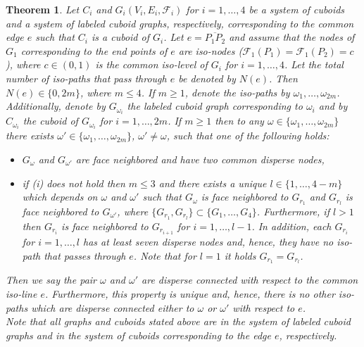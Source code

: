\documentclass[a4paper,11pt]{article}
\newtheorem{theorem}{Theorem}[section]
\begin{document}
\begin{theorem}
Let $C_i$ and $G_i(V_i,E_i,\mathcal{F}_i)$ for $i=1,\ldots,4$ be a system of cuboids and a system of
labeled cuboid graphs, respectively, corresponding to the common edge $e$ such that $C_i$ is a
cuboid of $G_i$. Let $e=\overline{P_1P_2}$ and assume that the nodes of $G_1$ corresponding to
the end points of $e$ are iso-nodes ($\mathcal{F}_1(P_1)=\mathcal{F}_1(P_2)=c$), where $c\in (0,1)$
is the common iso-level of $G_i$ for $i=1,\ldots,4$. Let the total number of iso-paths
that pass through $e$ be denoted by $N(e)$. Then $N(e)\in\{0,2m\}$, where
$m\leq 4$. If $m \geq 1$, denote the iso-paths by $\omega_1,\ldots,\omega_{2m}$. Additionally,
denote by $G_{\omega_i}$ the labeled cuboid graph corresponding to $\omega_i$ and by $C_{\omega_i}$
the cuboid of $G_{\omega_i}$ for $i=1,\ldots,2m$. If $m \geq 1$ then to any $\omega\in\{\omega_1,
\ldots,\omega_{2m}\}$ there exists $\omega'\in\{\omega_1,\ldots,\omega_{2m}\}$,
$\omega'\neq\omega$, such that one of the following holds:
\begin{itemize}
\item[(i)] $G_{\omega}$ and $G_{\omega'}$ are face neighbored and have two common
disperse nodes,
\item[(ii)] if (i) does not hold then $m\leq 3$ and there exists a unique $l\in\{1,\ldots,4-m\}$ which
depends on $\omega$ and $\omega'$ such that $G_{\omega}$ is face neighbored to $G_{r_1}$ and
$G_{r_l}$ is face neighbored to $G_{\omega'}$, where $\{G_{r_1},G_{r_l}\}\subset\{G_1,
\ldots,G_4\}$. Furthermore, if $l>1$ then $G_{r_i}$ is face neighbored to $G_{r_{i+1}}$
for $i=1,\ldots,l-1$. In addition, each $G_{r_i}$ for $i=1,\ldots,l$ has at least seven disperse
nodes and, hence, they have no iso-path that passes through $e$. Note that for $l=1$ it holds
$G_{r_1}=G_{r_l}$.
\end{itemize}
Then we say the pair $\omega$ and $\omega'$ are disperse connected with respect to the common
iso-line $e$. Furthermore, this property is unique and, hence, there is no other iso-paths which
are disperse connected either to $\omega$ or $\omega'$ with respect to $e$.\\

\noindent Note that all graphs and cuboids stated above are in the system of labeled cuboid
graphs and in the system of cuboids corresponding to the edge $e$, respectively.
\label{thm:connect-3}
\end{theorem}
\end{document}
